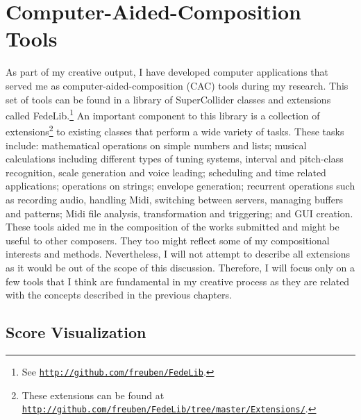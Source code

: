 \section{Computer-Aided-Composition Tools}

As part of my creative output, I have developed computer applications that served me as computer-aided-composition (CAC) tools during my research. This set of tools can be found in a library of  SuperCollider classes and extensions called FedeLib.\footnote{See \href{http://github.com/freuben/FedeLib}{\texttt{http://github.com/freuben/FedeLib}}.} An important component to this library is a collection of extensions\footnote{These extensions can be found at \href{http://github.com/freuben/FedeLib/tree/master/Extensions/}{\texttt{http://github.com/freuben/FedeLib/tree/master/Extensions/}}.} to existing classes that perform a wide variety of tasks. These tasks include: mathematical operations on simple numbers and lists; musical calculations including different types of tuning systems, interval and pitch-class recognition, scale generation and voice leading; scheduling and time related applications; operations on strings; envelope generation; recurrent operations such as recording audio, handling Midi, switching between servers, managing buffers and patterns; Midi file analysis, transformation and triggering; and GUI creation. These tools aided me in the composition of the works submitted and might be useful to other composers. They too might reflect some of my compositional interests and methods. Nevertheless, I will not attempt to describe all extensions as it would be out of the scope of this discussion. Therefore, I will focus only on a few tools that I think are fundamental in my creative process as they are related with the concepts described in the previous chapters.

\subsection{Score Visualization}

